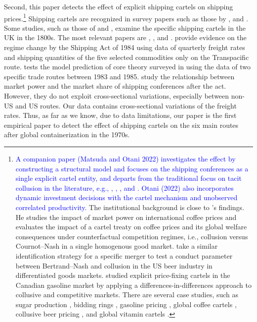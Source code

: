 \documentclass[11pt]{article}
\begin{document}
Second, this paper detects the effect of explicit shipping cartels on shipping prices.\footnote{\textcolor{blue}{A companion paper (Matsuda and Otani 2022) investigates the effect by constructing a structural model and focuses on the shipping conferences as a single explicit cartel entity, and departs from the traditional focus on tacit collusion in the literature, e.g., \cite{porter1983study}, \cite{bresnahan1987competition}, \cite{miller2017understanding}, and \cite{byrne2019learning}. Otani (2022) also incorporates dynamic investment decisions with the cartel mechanism and unobserved correlated productivity.} The institutional background is close to \cite{igami2015market}'s findings. He studies the impact of market power on international coffee prices and evaluates the impact of a cartel treaty on coffee prices and its global welfare consequences under counterfactual competition regimes, i.e., collusion versus Cournot–Nash in a single homogenous good market. \cite{miller2017understanding} take a similar identification strategy for a specific merger to test a conduct parameter between Bertrand–Nash and collusion in the US beer industry in differentiated goods markets. \cite{clark2013collusion,clark2014effect} studied explicit price-fixing cartels in the Canadian gasoline market by applying a differences-in-differences approach to collusive and competitive markets. There are several case studies, such as sugar production \citep{genesove1998testing,genesove2001rules}, bidding rings \citep{asker2010study}, gasoline pricing \citep{clark2013collusion,clark2014effect}, global coffee cartels \citep{igami2015market}, collusive beer pricing \citep{miller2017understanding}, and global vitamin cartels \citep{igami2022measuring}.} Shipping cartels are recognized in survey papers such as those by \cite{levenstein2006determines}, and \cite{asker2021}. Some studies, such as those of \cite{morton1997entry} and \cite{podolny1999social}, examine the specific shipping cartels in the UK in the 1800s. The most relevant papers are \cite{wilson1991some}, \cite{pirrong1992application}, and \cite{clyde1998market}. \cite{wilson1991some} provide evidence on the regime change by the Shipping Act of 1984 using data of quarterly freight rates and shipping quantities of the five selected commodities only on the Transpacific route. \cite{pirrong1992application} tests the model prediction of core theory surveyed in \cite{sjostrom2013competition} using the data of two specific trade routes between 1983 and 1985. \cite{clyde1998market} study the relationship between market power and the market share of shipping conferences after the act. However, they do not exploit cross-sectional variations, especially between non-US and US routes. Our data contains cross-sectional variations of the freight rates. Thus, as far as we know, due to data limitations, our paper is the first empirical paper to detect the effect of shipping cartels on the six main routes after global containerization in the 1970s.
\end{document}
